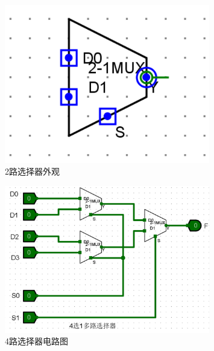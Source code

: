 \documentclass{article}
\begin{document}
    \begin{figure}[H]
    \centering
    \includegraphics[width=0.8\textwidth]{6.4.2.png}
    \caption{2路选择器外观}
    \end{figure}


    \begin{figure}[H]
    \centering
    \includegraphics[width=0.8\textwidth]{6.4.3.png}
    \caption{4路选择器电路图}
    \end{figure}
\end{document}
